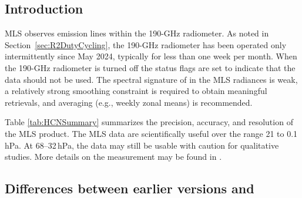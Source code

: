 
\subsection{Introduction}

MLS observes  emission lines within the 190-GHz radiometer. As noted in Section~\ref{sec:R2DutyCycling}, the 190\nobreakdash-GHz radiometer has been operated only intermittently since May 2024, typically for less than one week per month. When the \mbox{190-GHz} radiometer is turned off the  status flags are set to indicate that the data should not be used. The spectral signature of  in the MLS radiances is weak, a relatively strong smoothing constraint is required to obtain meaningful retrievals, and averaging (e.g., weekly zonal means) is recommended.

Table \ref{tab:HCNSummary} summarizes the precision, accuracy, and resolution of the MLS  product. The MLS \thisv {} data are scientifically useful over the range 21
to 0.1\,hPa. At 68--32\,hPa, the data may still be usable with caution for qualitative studies. More details on the  measurement may be found in \cite{PumphreyEtal:2006}.



\subsection{Differences between earlier versions and \thisv}

